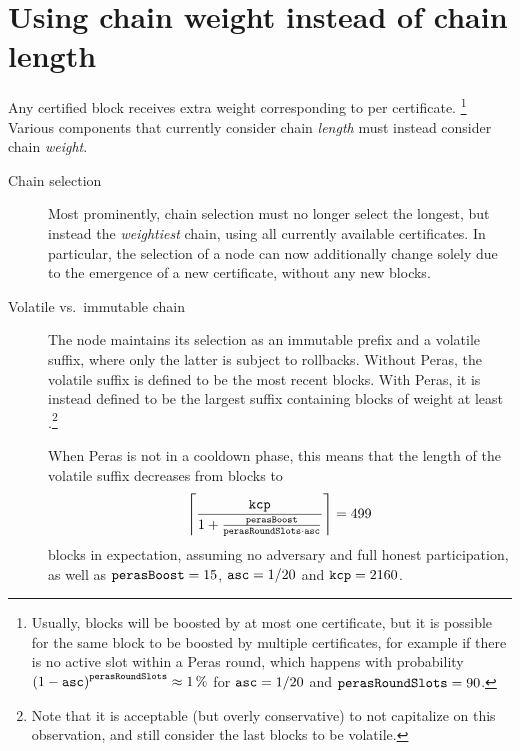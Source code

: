 \section{Using chain weight instead of chain length}\label{sec:weight not length}

Any certified block receives extra weight corresponding to \perasBoost{} per certificate.%
\footnote{Usually, blocks will be boosted by at most one certificate, but it is possible for the same block to be boosted by multiple certificates, for example if there is no active slot within a Peras round, which happens with probability ${(1-\mathtt{asc})}^{\mathtt{perasRoundSlots}} \approx \qty{1}{\percent}$ for $\mathtt{asc}=1/20$ and $\mathtt{perasRoundSlots}=90$.}
Various components that currently consider chain \emph{length} must instead consider chain \emph{weight}.

\begin{description}
\item[Chain selection]
  Most prominently, chain selection must no longer select the longest, but instead the \emph{weightiest} chain, using all currently available certificates.
  In particular, the selection of a node can now additionally change solely due to the emergence of a new certificate, without any new blocks.
\item[Volatile vs.\ immutable chain]
  The node maintains its selection as an immutable prefix and a volatile suffix, where only the latter is subject to rollbacks.
  Without Peras, the volatile suffix is defined to be the \kcp{} most recent blocks.
  With Peras, it is instead defined to be the largest suffix containing blocks of weight at least \kcp{}.\footnote{
    Note that it is acceptable (but overly conservative) to not capitalize on this observation, and still consider the last \kcp{} blocks to be volatile.}

  When Peras is not in a cooldown phase, this means that the length of the volatile suffix decreases from \kcp{} blocks to
  \[ \left\lceil \frac{\mathtt{kcp} }{1 + \frac{\mathtt{perasBoost}}{\mathtt{perasRoundSlots} \cdot \mathtt{asc}}} \right\rceil = 499 \]
  blocks in expectation, assuming no adversary and full honest participation, as well as $\mathtt{perasBoost} = 15$, $\mathtt{asc} = 1/20$ and $\mathtt{kcp} = 2160$.


\end{description}
